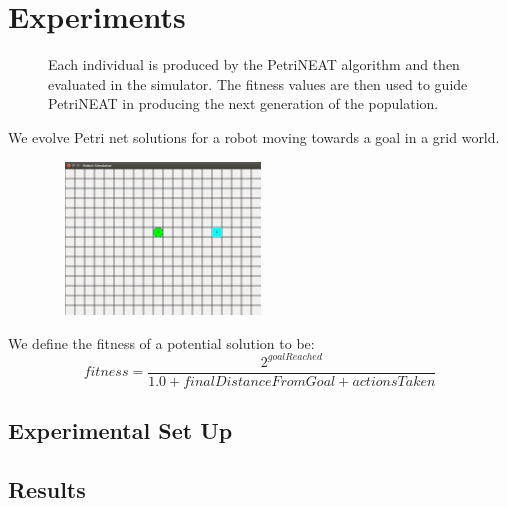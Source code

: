 \documentclass[12pt,a4paper,twocolumn]{article}
\begin{document}
\section{Experiments}

\begin{figure}[h]

\caption{Each individual is produced by the PetriNEAT algorithm and then evaluated in the simulator. The fitness values are then used to guide PetriNEAT in producing the next generation of the population.}
\end{figure}

We evolve Petri net solutions for a robot moving towards a goal in a grid world.
\begin{figure}
\includegraphics[trim = 80mm 80mm 20mm 70mm, clip, width = 2.4in, height = 1.6in]{robot_sim.png}
\end{figure}
We define the fitness of a potential solution to be:
$$fitness = \frac{2^{goalReached}}{1.0 + finalDistanceFromGoal + actionsTaken}$$

\subsection{Experimental Set Up}

\subsection{Results}
\end{document}
